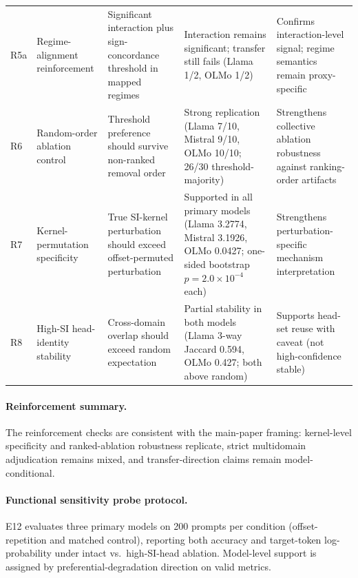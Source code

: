 \documentclass{article}
\begin{document}
\begin{table}[htbp]
\begin{tabular}{p{0.8cm}p{2.3cm}p{2.5cm}p{2.7cm}p{2.9cm}}
        R5a &
        Regime-alignment reinforcement &
        Significant interaction plus sign-concordance threshold in mapped regimes &
        Interaction remains significant; transfer still fails (Llama 1/2, OLMo 1/2) &
        Confirms interaction-level signal; regime semantics remain proxy-specific \\

        R6 &
        Random-order ablation control &
        Threshold preference should survive non-ranked removal order &
        Strong replication (Llama 7/10, Mistral 9/10, OLMo 10/10; 26/30 threshold-majority) &
        Strengthens collective ablation robustness against ranking-order artifacts \\

        R7 &
        Kernel-permutation specificity &
        True SI-kernel perturbation should exceed offset-permuted perturbation &
        Supported in all primary models (Llama 3.2774, Mistral 3.1926, OLMo 0.0427; one-sided bootstrap $p=2.0\times10^{-4}$ each) &
        Strengthens perturbation-specific mechanism interpretation \\

        R8 &
        High-SI head-identity stability &
        Cross-domain overlap should exceed random expectation &
        Partial stability in both models (Llama 3-way Jaccard 0.594, OLMo 0.427; both above random) &
        Supports head-set reuse with caveat (not high-confidence stable) \\
        \bottomrule
    \end{tabular}
\end{table}

\paragraph{Reinforcement summary.}
The reinforcement checks are consistent with the main-paper framing: kernel-level specificity and ranked-ablation robustness replicate, strict multidomain adjudication remains mixed, and transfer-direction claims remain model-conditional.

\paragraph{Functional sensitivity probe protocol.}
E12 evaluates three primary models on 200 prompts per condition (offset-repetition and matched control), reporting both accuracy and target-token log-probability under intact vs.\ high-SI-head ablation. Model-level support is assigned by preferential-degradation direction on valid metrics.
\end{document}
